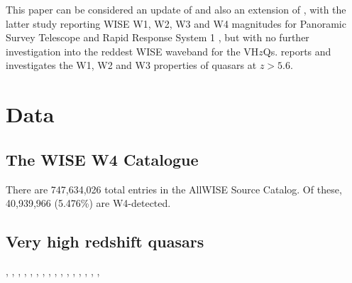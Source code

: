 \documentclass[usenatbib]{mnras}
\begin{document}
This paper can be considered an update of \citet{Blain2013} and also
an extension of \citet{Banados2014}, with the latter study reporting
WISE W1, W2, W3 and W4 magnitudes for Panoramic Survey Telescope and Rapid Response System 1 
\citep[Pan-STARRS1, PS1;][]{Kaiser2002, Kaiser2010}, but with no  
further investigation into the reddest WISE waveband for the VH$z$Qs.
\citet{Banados2016} reports and investigates the W1, W2 and W3 properties
of quasars at $z > 5.6$.



\section{Data}
\subsection{The WISE W4 Catalogue}
There are 747,634,026 total entries in the AllWISE Source Catalog.  Of
these, 40,939,966 (5.476\%) are W4-detected.

\subsection{Very high redshift quasars}

\citet{Mortlock2011}, \citet{McGreer2013}, 
\citet{Venemans2013}, 
\citet{Venemans2013}, 
\citet{Venemans2015a},  \citet{Venemans2015b}, \citet{Banados2016}, \citet{Matsuoka2016}, \citet{Reed2017}, \citet{Wang2017}, \citet{Mazzucchelli2017}, \citet{Ikeda2017}, \citet{Matsuoka2017}, \citet{Tang2017}, \citet{Koptelova2017}, \citet{Matsuoka2017}, \citet{Banados2018}
\end{document}
